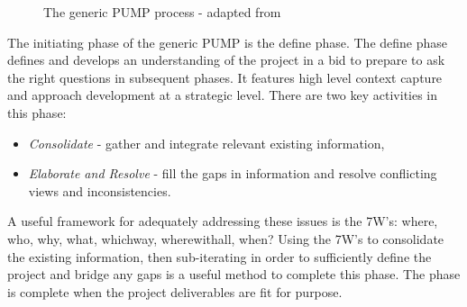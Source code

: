 \begin{figure}[!h]
  \centering
{} \quad
{}
\caption{The generic PUMP process - adapted from \cite{chapman}}
\label{Figure:GenericPUMP_Both}
\end{figure}

The initiating phase of the generic PUMP is the define phase.
The define phase defines and develops an understanding of the project in a bid to prepare to ask the right questions in subsequent phases.
It features high level context capture and approach development at a strategic level.
There are two key activities in this phase:
\begin{itemize}
\item \textit{Consolidate} - gather and integrate relevant existing information,
\item \textit{Elaborate and Resolve} - fill the gaps in information and resolve conflicting views and inconsistencies.
\end{itemize}
A useful framework for adequately addressing these issues is the 7W's: where, who, why, what, whichway, wherewithall, when? 
Using the 7W's to consolidate the existing information, then sub-iterating in order to sufficiently define the project and bridge any gaps is a useful method to complete this phase.
The phase is complete when the project deliverables are fit for purpose.

